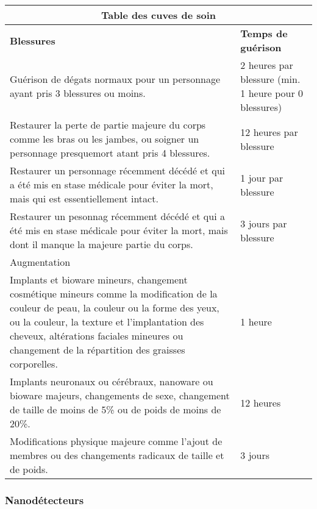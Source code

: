 \begin{table} \begin{tabularx}{\textwidth}{|X|X|} \hline

\multicolumn{2}{|c|}{Table des cuves de soin } \\ \hline

\textbf{Blessures}	&\textbf{Temps de guérison} \\ \hline

Guérison de dégats normaux pour un personnage ayant pris 3 blessures ou moins.	&2 heures par blessure (min. 1 heure pour 0 blessures) \\ \hline

Restaurer la perte de partie majeure du corps comme les bras ou les jambes, ou soigner un personnage presquemort atant pris 4 blessures.	&12 heures par blessure \\ \hline

Restaurer un personnage récemment décédé et qui a été mis en stase médicale pour éviter la mort, mais qui est essentiellement intact.	&1 jour par blessure \\ \hline

Restaurer un pesonnag récemment décédé et qui a été mis en stase médicale pour éviter la mort, mais dont il manque la majeure partie du corps.	&3 jours par blessure \\ \hline

\multicolumn{2}{|l|}{Augmentation} \\ \hline

Implants et bioware mineurs, changement cosmétique mineurs comme la modification de la couleur de peau, la couleur ou la forme des yeux, ou la couleur, la texture et l'implantation des cheveux, altérations faciales mineures ou changement de la répartition des graisses corporelles.	&1 heure \\ \hline

Implants neuronaux ou cérébraux, nanoware ou bioware majeurs, changements de sexe, changement de taille de moins de 5\% ou de poids de moins de 20\%.	&12 heures \\ \hline

Modifications physique majeure comme l'ajout de membres ou des changements radicaux de taille et de poids.	&3 jours \\ \hline

\end{tabularx} \label{tab:healing-vat} \end{table} 

\subsubsection{Nanodétecteurs} 

